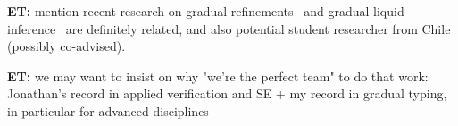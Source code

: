 \documentclass[10pt,twocolumn]{article}
\newcommand{\et}[1]{{\color{blue} {\bf ET:} #1}}
\begin{document}
\begin{sloppypar}
\et{mention recent research on gradual refinements~\cite{lehmannTanter:popl2017} and gradual liquid inference~\cite{vazouAl:oopsla2018} are definitely related, and also potential student researcher from Chile (possibly co-advised).}

\et{we may want to insist on why "we're the perfect team" to do that work: Jonathan's record in applied verification and SE + my record in gradual typing, in particular for advanced disciplines}




\end{sloppypar}
\end{document}

